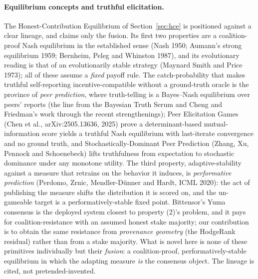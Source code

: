 \documentclass[10pt]{article}
\begin{document}
\paragraph{Equilibrium concepts and truthful elicitation.} The Honest-Contribution Equilibrium of
Section~\ref{sec:hce} is positioned against a clear lineage, and claims only the fusion. Its first two
properties are a coalition-proof Nash equilibrium in the established sense (Nash 1950; Aumann's strong
equilibrium 1959; Bernheim, Peleg and Whinston 1987), and its evolutionary reading is that of an
evolutionarily stable strategy (Maynard Smith and Price 1973); all of these assume a \emph{fixed}
payoff rule. The catch-probability that makes truthful self-reporting incentive-compatible without a
ground-truth oracle is the province of \emph{peer prediction}, where truth-telling is a Bayes--Nash
equilibrium over peers' reports (the line from the Bayesian Truth Serum and Cheng and Friedman's work
through the recent strengthenings); Peer Elicitation Games (Chen et al., arXiv:2505.13636, 2025) prove
a determinant-based mutual-information score yields a truthful Nash equilibrium with last-iterate
convergence and no ground truth, and Stochastically-Dominant Peer Prediction (Zhang, Xu, Pennock and
Schoenebeck) lifts truthfulness from expectation to stochastic dominance under any monotone utility.
The third property, adaptive-stability against a measure that retrains on the behavior it induces, is
\emph{performative prediction} (Perdomo, Zrnic, Mendler-D\"unner and Hardt, ICML 2020): the act of
publishing the measure shifts the distribution it is scored on, and the un-gameable target is a
performatively-stable fixed point. Bittensor's Yuma consensus is the deployed system closest to
property (2)'s problem, and it pays for coalition-resistance with an assumed honest stake majority; our
contribution is to obtain the same resistance from \emph{provenance geometry} (the HodgeRank residual)
rather than from a stake majority. What is novel here is none of these primitives individually but
their \emph{fusion}: a coalition-proof, performatively-stable equilibrium in which the adapting measure
\emph{is} the consensus object. The lineage is cited, not pretended-invented.
\end{document}
